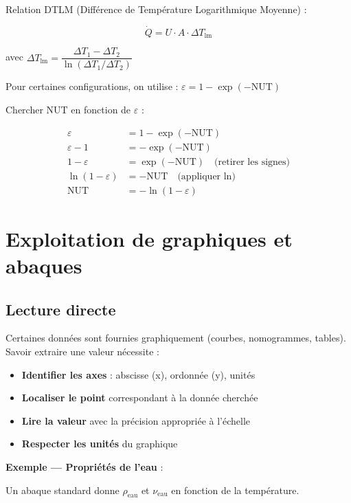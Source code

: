 Relation DTLM (Différence de Température Logarithmique Moyenne) :

\[
  \dot{Q} = U \cdot A \cdot \Delta T_{\mathrm{lm}}
\]

avec $\Delta T_{\mathrm{lm}} = \dfrac{\Delta T_1 - \Delta T_2}{\ln(\Delta T_1 / \Delta T_2)}$

Pour certaines configurations, on utilise : $\varepsilon = 1 - \exp(-\mathrm{NUT})$

Chercher $\mathrm{NUT}$ en fonction de $\varepsilon$ :

\begin{align*}
  \varepsilon &= 1 - \exp(-\mathrm{NUT}) \\
  \varepsilon - 1 &= - \exp(-\mathrm{NUT}) \\
  1 - \varepsilon &= \exp(-\mathrm{NUT}) \quad \text{(retirer les signes)} \\
  \ln(1 - \varepsilon) &= -\mathrm{NUT} \quad \text{(appliquer ln)} \\
  \mathrm{NUT} &= -\ln(1 - \varepsilon)
\end{align*}

\section{Exploitation de graphiques et abaques}

\subsection{Lecture directe}

Certaines données sont fournies graphiquement (courbes, nomogrammes, tables). Savoir extraire
une valeur nécessite :

\begin{itemize}
  \item \textbf{Identifier les axes} : abscisse (x), ordonnée (y), unités
  \item \textbf{Localiser le point} correspondant à la donnée cherchée
  \item \textbf{Lire la valeur} avec la précision appropriée à l'échelle
  \item \textbf{Respecter les unités} du graphique
\end{itemize}

\textbf{Exemple — Propriétés de l'eau} :

Un abaque standard donne $\rho_{\mathrm{eau}}$ et $\nu_{\mathrm{eau}}$ en fonction de la
température.

